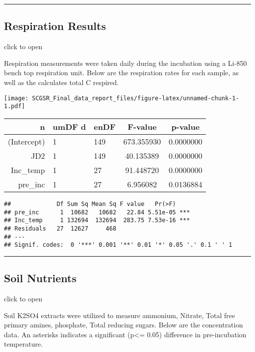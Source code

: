 \documentclass[
]{article}
\begin{document}
\begin{center}\rule{0.5\linewidth}{0.5pt}\end{center}

\hypertarget{respiration-results}{%
\subsection{Respiration Results}\label{respiration-results}}

click to open

Respiration measurements were taken daily during the incubation using a
Li-850 bench top respiration unit. Below are the respiration rates for
each sample, as well as the calculates total C respired.

\texttt{[image: SCGSR\_Final\_data\_report\_files/figure-latex/unnamed-chunk-1-1.pdf]}

\begin{longtable}[]{@{}rllcc@{}}
\toprule()
n & umDF d & enDF & F-value & p-value \\
\midrule()
\endhead
(Intercept) & 1 & 149 & 673.355930 & 0.0000000 \\
JD2 & 1 & 149 & 40.135389 & 0.0000000 \\
Inc\_temp & 1 & 27 & 91.448720 & 0.0000000 \\
pre\_inc & 1 & 27 & 6.956082 & 0.0136884 \\
\bottomrule()
\end{longtable}

\begin{verbatim}
##             Df Sum Sq Mean Sq F value   Pr(>F)    
## pre_inc      1  10682   10682   22.84 5.51e-05 ***
## Inc_temp     1 132694  132694  283.75 7.53e-16 ***
## Residuals   27  12627     468                     
## ---
## Signif. codes:  0 '***' 0.001 '**' 0.01 '*' 0.05 '.' 0.1 ' ' 1
\end{verbatim}

\begin{center}\rule{0.5\linewidth}{0.5pt}\end{center}

\hypertarget{soil-nutrients}{%
\subsection{Soil Nutrients}\label{soil-nutrients}}

click to open

Soil K2SO4 extracts were utilized to measure ammonium, Nitrate, Total
free primary amines, phosphate, Total reducing sugars. Below are the
concentration data. An asterisks indicates a significant (p\textless=
0.05) difference in pre-incubation temperature.
\end{document}
